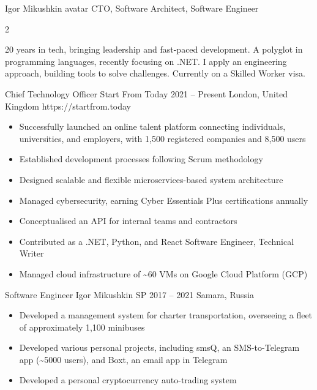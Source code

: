 \documentclass[9pt,a4paper]{igrmkcv}
\begin{document}
\makeCvHeader
    {Igor Mikushkin}
    {avatar}
    {CTO, Software Architect, Software Engineer}

\begin{paracol}{2}

20 years in tech, bringing leadership and fast-paced development.
A polyglot in programming languages, recently focusing on .NET.
I apply an engineering approach, building tools to solve challenges.
Currently on a Skilled Worker visa.

    \cvLeftEvent
        {Chief Technology Officer}
        {Start From Today}
        {2021 -- Present}
        {London, United Kingdom}
        {https://startfrom.today}

        \begin{itemize}
            \item Successfully launched an online talent platform connecting individuals,
                  universities, and employers, with 1,500 registered companies and 8,500 users
            \item Established development processes following Scrum methodology
            \item Designed scalable and flexible microservices-based system architecture
            \item Managed cybersecurity, earning Cyber Essentials Plus certifications annually
            \item Conceptualised an API for internal teams and contractors
            \item Contributed as a .NET, Python, and React Software Engineer, Technical Writer
            \item Managed cloud infrastructure of
                  \textasciitilde 60 VMs on Google Cloud Platform (GCP)
        \end{itemize}

    \cvLeftEvent
        {Software Engineer}
        {Igor Mikushkin SP}
        {2017 -- 2021}
        {Samara, Russia}
        {}

        \begin{itemize}
            \item Developed a management system for charter transportation, overseeing a fleet of approximately 1,100 minibuses
            \item Developed various personal projects,
                  including smsQ, an SMS-to-Telegram app (\textasciitilde 5000 users),
                  and Boxt, an email app in Telegram
            \item Developed a personal cryptocurrency auto-trading system
        \end{itemize}


\end{paracol}
\end{document}
